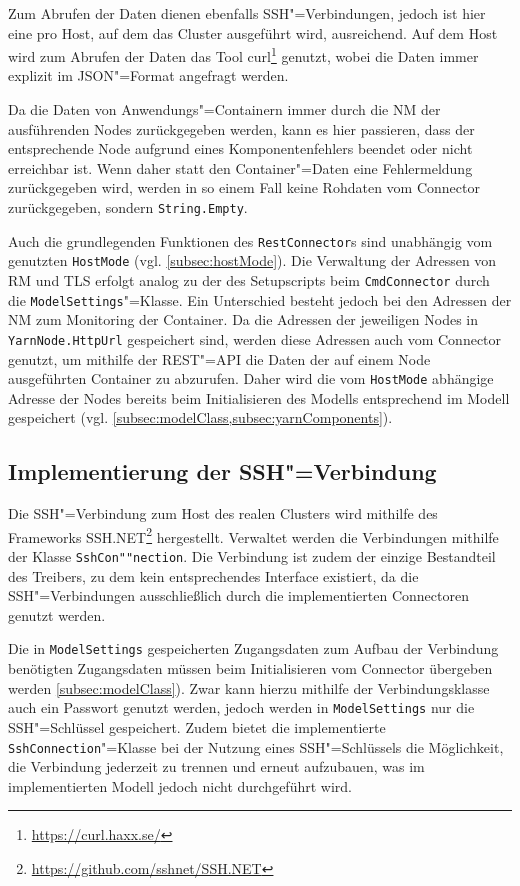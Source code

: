 Zum Abrufen der Daten dienen ebenfalls SSH"=Verbindungen, jedoch ist hier eine pro Host, auf dem das Cluster ausgeführt wird, ausreichend.
Auf dem Host wird zum Abrufen der Daten das Tool curl\footnote{\url{https://curl.haxx.se/}} genutzt, wobei die Daten immer explizit im JSON"=Format angefragt werden.

Da die Daten von Anwendungs"=Containern immer durch die \gls{NM} der ausführenden Nodes zurückgegeben werden, kann es hier passieren, dass der entsprechende Node aufgrund eines Komponentenfehlers beendet oder nicht erreichbar ist.
Wenn daher statt den Container"=Daten eine Fehlermeldung zurückgegeben wird, werden in so einem Fall keine Rohdaten vom Connector zurückgegeben, sondern \texttt{String.Empty}.

Auch die grundlegenden Funktionen des \texttt{RestConnector}s sind unabhängig vom genutzten \texttt{HostMode} (vgl. \cref{subsec:hostMode}).
Die Verwaltung der Adressen von \gls{RM} und \gls{TLS} erfolgt analog zu der des Setupscripts beim \texttt{CmdConnector} durch die \texttt{ModelSettings}"=Klasse.
Ein Unterschied besteht jedoch bei den Adressen der \gls{NM} zum Monitoring der Container.
Da die Adressen der jeweiligen Nodes in \texttt{YarnNode.HttpUrl} gespeichert sind, werden diese Adressen auch vom Connector genutzt, um mithilfe der REST"=API die Daten der auf einem Node ausgeführten Container zu abzurufen.
Daher wird die vom \texttt{HostMode} abhängige Adresse der Nodes bereits beim Initialisieren des Modells entsprechend im Modell gespeichert (vgl. \cref{subsec:modelClass,subsec:yarnComponents}).

\subsection{Implementierung der SSH"=Verbindung}
\label{subsec:sshConnection}

Die SSH"=Verbindung zum Host des realen Clusters wird mithilfe des Frameworks SSH.NET\footnote{\url{https://github.com/sshnet/SSH.NET}} hergestellt.
Verwaltet werden die Verbindungen mithilfe der Klasse \texttt{SshCon""nection}.
Die Verbindung ist zudem der einzige Bestandteil des Treibers, zu dem kein entsprechendes Interface existiert, da die SSH"=Verbindungen ausschließlich durch die implementierten Connectoren genutzt werden.

Die in \texttt{ModelSettings} gespeicherten Zugangsdaten zum Aufbau der Verbindung benötigten Zugangsdaten müssen beim Initialisieren vom Connector übergeben werden \cref{subsec:modelClass}).
Zwar kann hierzu mithilfe der Verbindungsklasse auch ein Passwort genutzt werden, jedoch werden in \texttt{ModelSettings} nur die SSH"=Schlüssel gespeichert.
Zudem bietet die implementierte \texttt{SshConnection}"=Klasse bei der Nutzung eines SSH"=Schlüssels die Möglichkeit, die Verbindung jederzeit zu trennen und erneut aufzubauen, was im implementierten Modell jedoch nicht durchgeführt wird.

